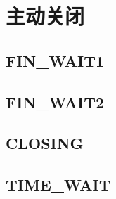 \section{主动关闭}

\subsection{FIN\_WAIT1}

\subsection{FIN\_WAIT2}

\subsection{CLOSING}

\subsection{TIME\_WAIT}
